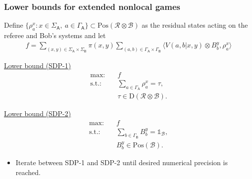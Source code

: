 \documentclass{beamer}
\def\I{\mathds{1}}
\newcommand{\biggip}[2]{\biggl\langle #1, #2 \biggr\rangle}
\def\B{\mathcal{B}}
\def\R{\mathcal{R}}
\def \GammaA{\Gamma_{\reg{A}}}
\def \GammaB{\Gamma_{\reg{B}}}
\def \SigmaA{\Sigma_{\reg{A}}}
\def \SigmaB{\Sigma_{\reg{B}}}
\newcommand{\setft}[1]{\mathrm{#1}}
\newcommand{\Density}{\setft{D}}
\newcommand{\Pos}{\setft{Pos}}
\newcommand{\reg}[1]{\mathsf{#1}}
\begin{document}
\begin{frame}[noframenumbering]
	\frametitle{Lower bounds for extended nonlocal games}
Define $\{ \rho_a^x : x \in \SigmaA, \ a \in \GammaA \} \subset \Pos(\R \otimes \B)$ as the residual states acting on the referee and Bob's systems and let
	\begin{align*}
		f = \sum_{(x,y) \in \SigmaA \times \SigmaB} \pi(x,y) \sum_{(a,b) \in \GammaA \times \GammaB} \biggip{V(a,b|x,y) \otimes B_b^y}{\rho_a^x}
	\end{align*}
        \vspace{10pt}
        \begin{minipage}[t]{0.48\linewidth}
            \begin{center}
            \underline{Lower bound (SDP-1)}
            \begin{equation*}
              \begin{split}
                \text{max:} \quad & 
                f \\
                \text{s.t.:} \quad & \sum_{a \in \GammaA} \rho_a^x = \tau,\\
                  & \tau \in \Density(\R \otimes \B).
              \end{split}
            \end{equation*}
            \end{center}
        \end{minipage}\hfill
        \begin{minipage}[t]{0.48\linewidth}
            \begin{center}
            \underline{Lower bound (SDP-2)}
            \begin{equation*}
              \begin{split}
                \text{max:} \quad & f \\
                \text{s.t.:} \quad & \sum_{b \in \GammaB} B_b^y = \I_{\B}, \\                
                \quad & B_b^y \in \Pos(\B).
              \end{split}
            \end{equation*}
            \end{center}
        \end{minipage}
        \vspace{10pt}
        \begin{itemize}
          \item Iterate between SDP-1 and SDP-2 until desired numerical precision is reached. 
        \end{itemize}
    \end{frame}

   


    
\end{document}

